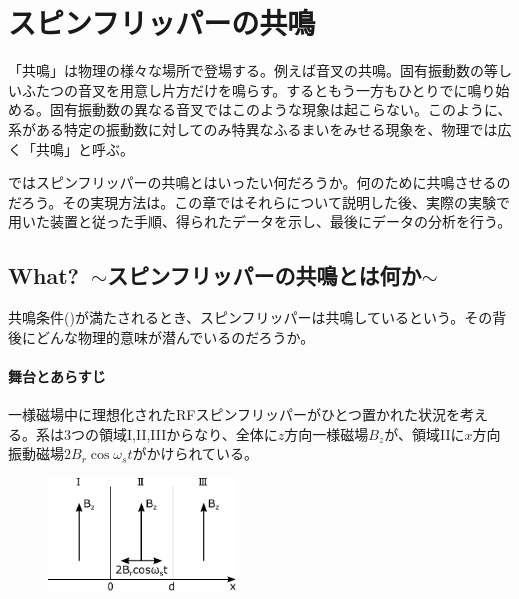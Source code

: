 \section{スピンフリッパーの共鳴}

「共鳴」は物理の様々な場所で登場する。例えば音叉の共鳴。固有振動数の等しいふたつの音叉を用意し片方だけを鳴らす。するともう一方もひとりでに鳴り始める。固有振動数の異なる音叉ではこのような現象は起こらない。このように、系がある特定の振動数に対してのみ特異なふるまいをみせる現象を、物理では広く「共鳴」と呼ぶ。

ではスピンフリッパーの共鳴とはいったい何だろうか。何のために共鳴させるのだろう。その実現方法は。この章ではそれらについて説明した後、実際の実験で用いた装置と従った手順、得られたデータを示し、最後にデータの分析を行う。

\subsection{What?\ $\sim$スピンフリッパーの共鳴とは何か$\sim$} \label{Resonance_what}
共鳴条件()が満たされるとき、スピンフリッパーは共鳴しているという。その背後にどんな物理的意味が潜んでいるのだろうか。

\paragraph{舞台とあらすじ}
一様磁場中に理想化されたRFスピンフリッパーがひとつ置かれた状況を考える。系は3つの領域I,II,IIIからなり、全体に$z$方向一様磁場$B_z$が、領域IIに$x$方向振動磁場$2B_r \cos \omega_s t$がかけられている。
\begin{figure}[h]
\centering
\includegraphics[height=3cm]{resonance/whatwhyhow/Resonance_what_setting.pdf}
\end{figure}

